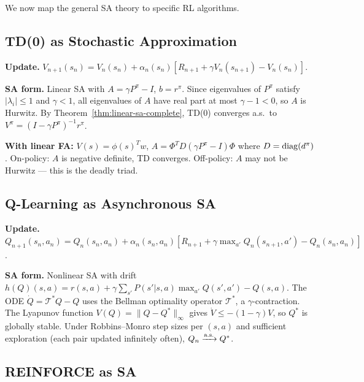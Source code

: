 \documentclass[11pt,a4paper]{article}
\begin{document}
We now map the general SA theory to specific RL algorithms.

\subsection{TD(0) as Stochastic Approximation}

\begin{rlconnection}[title={TD(0) -- Complete SA Analysis}]
\textbf{Update.}
$V_{n+1}(s_n) = V_n(s_n) + \alpha_n(s_n)
  [R_{n+1} + \gamma V_n(s_{n+1}) - V_n(s_n)]$.

\textbf{SA form.} Linear SA with $A = \gamma P^\pi - I$,
$b = r^\pi$. Since eigenvalues of $P^\pi$ satisfy $|\lambda_i| \leq 1$
and $\gamma < 1$, all eigenvalues of $A$ have real part at most
$\gamma - 1 < 0$, so $A$ is Hurwitz. By
Theorem~\ref{thm:linear-sa-complete}, TD(0) converges a.s.\ to
$V^\pi = (I - \gamma P^\pi)^{-1}r^\pi$.

\textbf{With linear FA:} $V(s) = \phi(s)^T w$, $A = \Phi^T D(\gamma
P^\pi - I)\Phi$ where $D = \operatorname{diag}(d^\pi)$. On-policy: $A$ is negative
definite, TD converges. Off-policy: $A$ may not be Hurwitz --- this is
the deadly triad.
\end{rlconnection}

\subsection{Q-Learning as Asynchronous SA}

\begin{rlconnection}[title={Q-Learning -- Asynchronous SA}]
\textbf{Update.}
$Q_{n+1}(s_n,a_n) = Q_n(s_n,a_n) + \alpha_n(s_n,a_n)
  [R_{n+1} + \gamma\max_{a'} Q_n(s_{n+1},a') - Q_n(s_n,a_n)]$.

\textbf{SA form.} Nonlinear SA with drift
$h(Q)(s,a) = r(s,a) + \gamma\sum_{s'}P(s'|s,a)\max_{a'}Q(s',a') -
Q(s,a)$. The ODE $\dot{Q} = \mathcal{T}^*Q - Q$ uses the Bellman
optimality operator $\mathcal{T}^*$, a $\gamma$-contraction. The
Lyapunov function $V(Q) = \|Q - Q^*\|_\infty$ gives
$\dot{V} \leq -(1-\gamma)V$, so $Q^*$ is globally stable. Under
Robbins--Monro step sizes per $(s,a)$ and sufficient exploration
(each pair updated infinitely often), $Q_n \xrightarrow{\text{a.s.}} Q^*$.
\end{rlconnection}

\subsection{REINFORCE as SA}
\end{document}
